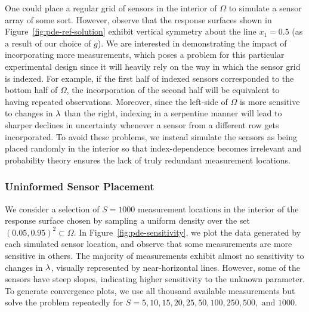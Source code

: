 One could place a regular grid of sensors in the interior of $\Omega$ to simulate a sensor array of some sort.
However, observe that the response surfaces shown in Figure~\ref{fig:pde-ref-solution} exhibit vertical symmetry about the line $x_1=0.5$ (as a result of our choice of $g$).
We are interested in demonstrating the impact of incorporating more measurements, which poses a problem for this particular experimental design since it will heavily rely on the way in which the sensor grid is indexed.
For example, if the first half of indexed sensors corresponded to the bottom half of $\Omega$, the incorporation of the second half will be equivalent to having repeated observations.
Moreover, since the left-side of $\Omega$ is more sensitive to changes in $\lambda$ than the right, indexing in a serpentine manner will lead to sharper declines in uncertainty whenever a sensor from a different row gets incorporated.
To avoid these problems, we instead simulate the sensors as being placed randomly in the interior so that index-dependence becomes irrelevant and  probability theory ensures the lack of truly redundant measurement locations.

\subsubsection{Uninformed Sensor Placement}

We consider a selection of $S=1000$ measurement locations in the interior of the response surface chosen by sampling a uniform density over the set $(0.05, 0.95)^2 \subset \Omega$.
In Figure~\ref{fig:pde-sensitivity}, we plot the data generated by each simulated sensor location, and observe that some measurements are more sensitive in others.
The majority of measurements exhibit almost no sensitivity to changes in $\lambda$, visually represented by near-horizontal lines.
However, some of the sensors have steep slopes, indicating higher sensitivity to the unknown parameter.
To generate convergence plots, we use all thousand available measurements but solve the problem repeatedly for $S = 5, 10, 15, 20, 25, 50, 100, 250, 500, \text{ and } 1000$.


